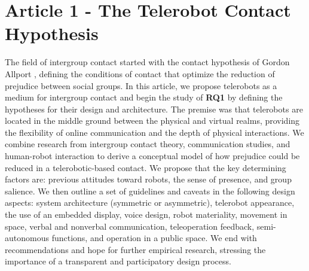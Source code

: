 \documentclass[dissertation,math,vertlayout,pdfa,colorlinks,nologo]{aaltoseries}
\begin{document}
\section{Article 1 - The Telerobot Contact Hypothesis}
The field of intergroup contact started with the contact hypothesis of Gordon Allport \cite{allportNaturePrejudice1954}, defining the conditions of contact that optimize the reduction of prejudice between social groups. In this article, we propose telerobots as a medium for intergroup contact and begin the study of \textbf{RQ1} by defining the hypotheses for their design and architecture. The premise was that telerobots are located in the middle ground between the physical and virtual realms, providing the flexibility of online communication and the depth of physical interactions. We combine research from intergroup contact theory, communication studies, and human-robot interaction to derive a conceptual model of how prejudice could be reduced in a telerobotic-based contact. We propose that the key determining factors are: previous attitudes toward robots, the sense of presence, and group salience. We then outline a set of guidelines and caveats in the following design aspects: system architecture (symmetric or asymmetric), telerobot appearance, the use of an embedded display, voice design, robot materiality, movement in space, verbal and nonverbal communication, teleoperation feedback, semi-autonomous functions, and operation in a public space. We end with recommendations and hope for further empirical research, stressing the importance of a transparent and participatory design process.
\end{document}
